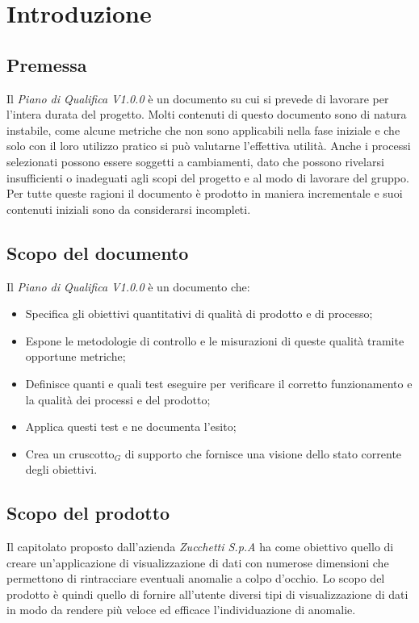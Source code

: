 \chapter{Introduzione}
\section{Premessa}

Il \textit{Piano di Qualifica V1.0.0} è un documento su cui si prevede di lavorare per l'intera durata del progetto. Molti contenuti di questo documento sono di natura instabile, come alcune metriche che non sono applicabili nella fase iniziale e che solo con il loro utilizzo pratico si può valutarne l'effettiva utilità. Anche i processi selezionati possono essere soggetti a cambiamenti, dato che possono rivelarsi insufficienti o inadeguati agli scopi del progetto e al modo di lavorare del gruppo.
Per tutte queste ragioni il documento è prodotto in maniera incrementale e suoi contenuti iniziali sono da considerarsi incompleti.

\section{Scopo del documento}
Il \textit{Piano di Qualifica V1.0.0} è un documento che:
\begin{itemize}
    \item Specifica gli obiettivi
    quantitativi di qualità di prodotto e di processo;
    \item Espone le
    metodologie di controllo e le misurazioni di queste qualità tramite
    opportune metriche;
    \item Definisce quanti e quali test eseguire per verificare il corretto funzionamento
    e la qualità dei processi e del prodotto;
    \item Applica questi test e ne documenta l'esito;
    \item Crea un cruscotto$_G$ di supporto che fornisce
    una visione dello stato corrente degli obiettivi.
\end{itemize}

\section{Scopo del prodotto}
Il capitolato proposto dall'azienda \textit{Zucchetti S.p.A} ha come obiettivo quello di creare un'applicazione di visualizzazione di dati con numerose dimensioni che permettono di rintracciare eventuali anomalie a colpo d'occhio. Lo scopo del prodotto è quindi quello di fornire all'utente diversi tipi di visualizzazione di dati in modo da rendere più veloce ed efficace l'individuazione di anomalie.

